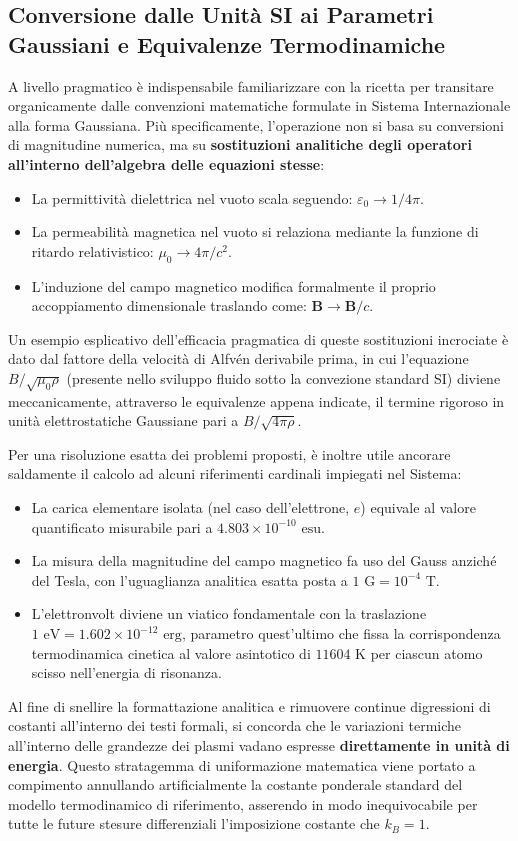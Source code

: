 \subsection{Conversione dalle Unità SI ai Parametri Gaussiani e Equivalenze Termodinamiche}
A livello pragmatico è indispensabile familiarizzare con la ricetta per transitare organicamente dalle convenzioni matematiche formulate in Sistema Internazionale alla forma Gaussiana. Più specificamente, l'operazione non si basa su conversioni di magnitudine numerica, ma su \textbf{sostituzioni analitiche degli operatori all'interno dell'algebra delle equazioni stesse}:
\begin{itemize}
\item La permittività dielettrica nel vuoto scala seguendo: $\varepsilon_0 \to 1/4\pi$.
\item La permeabilità magnetica nel vuoto si relaziona mediante la funzione di ritardo relativistico: $\mu_0 \to 4\pi/c^2$.
\item L'induzione del campo magnetico modifica formalmente il proprio accoppiamento dimensionale traslando come: $\mathbf{B} \to \mathbf{B}/c$.
\end{itemize}
Un esempio esplicativo dell'efficacia pragmatica di queste sostituzioni incrociate è dato dal fattore della velocità di Alfvén derivabile prima, in cui l'equazione $B/\sqrt{\mu_0 \rho}$ (presente nello sviluppo fluido sotto la convezione standard SI) diviene meccanicamente, attraverso le equivalenze appena indicate, il termine rigoroso in unità elettrostatiche Gaussiane pari a $B/\sqrt{4\pi \rho}$.

Per una risoluzione esatta dei problemi proposti, è inoltre utile ancorare saldamente il calcolo ad alcuni riferimenti cardinali impiegati nel Sistema:
\begin{itemize}
\item La carica elementare isolata (nel caso dell'elettrone, $e$) equivale al valore quantificato misurabile pari a $4.803 \times 10^{-10} \text{ esu}$.
\item La misura della magnitudine del campo magnetico fa uso del Gauss anziché del Tesla, con l'uguaglianza analitica esatta posta a $1 \text{ G} = 10^{-4} \text{ T}$.
\item L'elettronvolt diviene un viatico fondamentale con la traslazione $1 \text{ eV} = 1.602 \times 10^{-12} \text{ erg}$, parametro quest'ultimo che fissa la corrispondenza termodinamica cinetica al valore asintotico di $11604 \text{ K}$ per ciascun atomo scisso nell'energia di risonanza.
\end{itemize}
Al fine di snellire la formattazione analitica e rimuovere continue digressioni di costanti all'interno dei testi formali, si concorda che le variazioni termiche all'interno delle grandezze dei plasmi vadano espresse \textbf{direttamente in unità di energia}. Questo stratagemma di uniformazione matematica viene portato a compimento annullando artificialmente la costante ponderale standard del modello termodinamico di riferimento, asserendo in modo inequivocabile per tutte le future stesure differenziali l'imposizione costante che $k_B = 1$.

